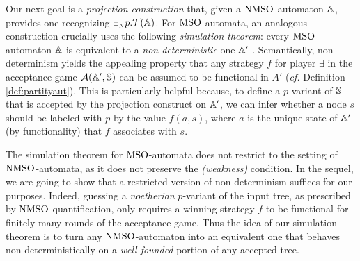 Our next goal is a \emph{projection construction} that, given
a $\mathrm{NMSO}$-automaton $\mathbb{A}$, provides one recognizing ${\exists_{{\scriptscriptstyle N}} p}.\mathcal{T}(\mathbb{A})$. For $\mathrm{MSO}$-automata, an analogous construction crucially uses the following \emph{simulation theorem}: every
$\mathrm{MSO}$-automaton $\mathbb{A}$ is equivalent to a \emph{non-deterministic} one $\mathbb{A}'$ \cite{Walukiewicz96}. Semantically, non-determinism yields the appealing property that any strategy $f$ for player $\exists$ in the acceptance game $\mathcal{A}(\mathbb{A}',\mathbb{S})$ can be assumed to be functional in $A'$ (\emph{cf.} Definition \ref{def:partityaut}).
This is particularly helpful because, to define a $p$-variant of $\mathbb{S}$
that is accepted by the projection construct on $\mathbb{A}'$, we
can infer whether a node $s$ should be labeled with $p$ by the value $f(a,s)$, where $a$ is the unique state of $\mathbb{A}'$ (by functionality) that $f$ associates with $s$.

The simulation theorem for $\mathrm{MSO}$-automata does not restrict to the setting of $\mathrm{NMSO}$-automata, as it does not preserve the \emph{(weakness)} condition. In the sequel, we are going to show that a restricted version of non-determinism suffices for our purposes. Indeed, guessing a \emph{noetherian} $p$-variant of the input tree, as prescribed by $\mathrm{NMSO}$ quantification, only requires a winning strategy $f$ to be functional for finitely many rounds of the acceptance game. Thus the idea of our simulation theorem is to turn any $\mathrm{NMSO}$-automaton into an equivalent one that behaves non-deterministically on a \emph{well-founded} portion of any accepted tree.

